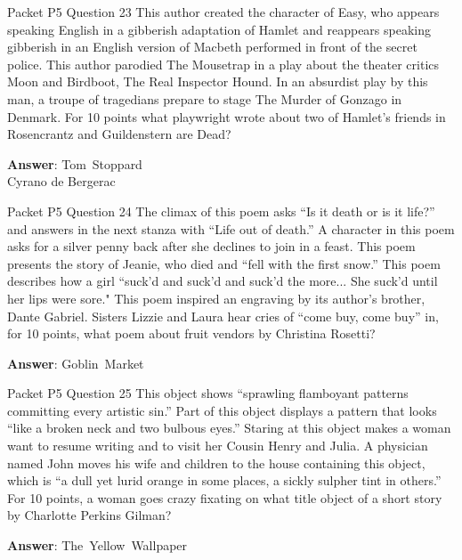 \begin{frame}{Packet P5 Question 23}
This author created the character of Easy, who appears speaking English in a gibberish adaptation of Hamlet and reappears speaking gibberish in   an English version of Macbeth performed in front of the secret police. This author parodied The Mousetrap in a play about the theater critics Moon and Birdboot, The Real Inspector   Hound. In an absurdist   play by this man, a troupe of tragedians prepare to stage   The Murder of Gonzago in Denmark. For 10 points what playwright wrote about two of Hamlet's friends   in Rosencrantz and Guildenstern are Dead?

\textbf{Answer}: Tom\ Stoppard\\
 Cyrano de Bergerac
\end{frame}

\begin{frame}{Packet P5 Question 24}
The climax of this poem asks ``Is it death or is it life?'' and answers in the next stanza with ``Life out of death.'' A character in this poem asks for a silver penny back after she declines to join in a feast. This poem presents the story of Jeanie, who died and ``fell   with the first snow.'' This poem describes how a girl “suck’d and suck’d and suck’d the more... She suck’d until her lips were sore." This poem inspired an engraving by its author’s brother, Dante Gabriel. Sisters Lizzie and Laura hear     cries of “come buy, come buy” in, for 10 points, what poem about fruit vendors by   Christina Rosetti?

\textbf{Answer}: Goblin\ Market\\
\end{frame}

\begin{frame}{Packet P5 Question 25}
This object shows “sprawling flamboyant patterns committing every artistic sin.” Part of this object displays a pattern that looks ``like a broken neck and two bulbous eyes.'' Staring at this object makes a woman want to resume writing and to visit her Cousin Henry   and Julia. A physician named John moves   his wife and children to the house containing this object, which is “a dull yet lurid orange in some places, a sickly sulpher tint in others.” For 10 points, a woman goes crazy fixating on what title object of a short story by Charlotte Perkins   Gilman?  

\textbf{Answer}: The\ Yellow\ Wallpaper\\
\end{frame}

